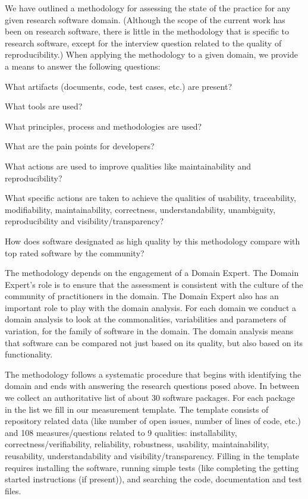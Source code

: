 \documentclass[letterpaper,cleveref]{lipics-v2019}
\begin{document}
We have outlined a methodology for assessing the state of the practice for any
given research software domain.  (Although the scope of the current work has been
on research software, there is little in the methodology that is specific to
research software, except for the interview question related to the quality of
reproducibility.)  When applying the methodology to a given domain, we provide a
means to answer the following questions:
\begin{inparaenum}[i)]
\item What artifacts (documents, code, test cases, etc.) are present?
\item What tools are used?
\item What principles, process and methodologies are used?
\item What are the pain points for developers?
\item What actions are used to improve qualities like maintainability and
reproducibility?
\item What specific actions are taken to achieve the qualities of usability,
traceability, modifiability, maintainability, correctness, understandability,
unambiguity, reproducibility and visibility/transparency?
\item How does software designated as high quality by this methodology compare
  with top rated software by the community?
\end{inparaenum} 

The methodology depends on the engagement of a Domain Expert.  The Domain
Expert's role is to ensure that the assessment is consistent with the culture of
the community of practitioners in the domain.  The Domain Expert also has an
important role to play with the domain analysis.  For each domain we 
conduct a domain analysis to look at the commonalities, variabilities and
parameters of variation, for the family of software in the domain.  The domain
analysis means that software can be compared not just based on its quality, but
also based on its functionality.

The methodology follows a systematic procedure that begins with identifying the
domain and ends with answering the research questions posed above.  In between
we collect an authoritative list of about 30 software packages.  For each
package in the list we fill in our measurement template.  The template consists
of repository related data (like number of open issues, number of lines of code,
etc.) and 108 measures/questions related to 9 qualities: installability,
correctness/verifiability, reliability, robustness, usability, maintainability,
reusability, understandability and visibility/transparency. Filling in the
template requires installing the software, running simple tests (like completing
the getting started instructions (if present)), and searching the code,
documentation and test files.
\end{document}

